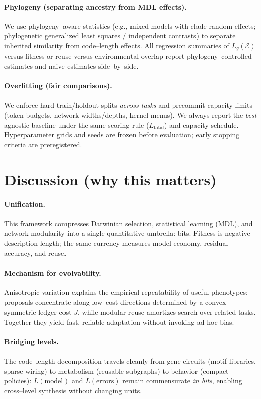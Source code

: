 \documentclass[11pt,a4paper]{article}
\begin{document}
\paragraph{Phylogeny (separating ancestry from MDL effects).}
We use phylogeny–aware statistics (e.g., mixed models with clade random effects; phylogenetic generalized least squares / independent contrasts) to separate inherited similarity from code–length effects. All regression summaries of $L_g(\mathcal{E})$ versus fitness or reuse versus environmental overlap report phylogeny–controlled estimates and naive estimates side–by–side.

\paragraph{Overfitting (fair comparisons).}
We enforce hard train/holdout splits \emph{across tasks} and precommit capacity limits (token budgets, network widths/depths, kernel menus). We always report the \emph{best} agnostic baseline under the same scoring rule ($L_{\mathrm{total}}$) and capacity schedule. Hyperparameter grids and seeds are frozen before evaluation; early stopping criteria are preregistered.


\section{Discussion (why this matters)}

\paragraph{Unification.}
This framework compresses Darwinian selection, statistical learning (MDL), and network modularity into a single quantitative umbrella: bits. Fitness is negative description length; the same currency measures model economy, residual accuracy, and reuse.

\paragraph{Mechanism for evolvability.}
Anisotropic variation explains the empirical repeatability of useful phenotypes: proposals concentrate along low–cost directions determined by a convex symmetric ledger cost $J$, while modular reuse amortizes search over related tasks. Together they yield fast, reliable adaptation without invoking ad hoc bias.

\paragraph{Bridging levels.}
The code–length decomposition travels cleanly from gene circuits (motif libraries, sparse wiring) to metabolism (reusable subgraphs) to behavior (compact policies): $L(\text{model})$ and $L(\text{errors})$ remain commensurate \emph{in bits}, enabling cross–level synthesis without changing units.
\end{document}
